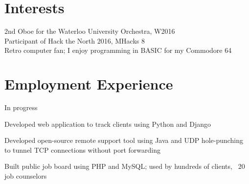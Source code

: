 \documentclass[]{deedy-resume-openfont}
\begin{document}
\begin{minipage}[t]{0.31\textwidth}
\section{Interests}
\textbullet{} 2nd Oboe for the Waterloo University Orchestra, W2016\\
\textbullet{} Participant of Hack the North 2016, MHacks 8\\
\textbullet{} Retro computer fan; I enjoy programming in BASIC for my Commodore 64\\

%
%

\end{minipage} 
\hfill
\begin{minipage}[t]{0.67\textwidth} 


\section{Employment Experience}
\vspace{\topsep} %
\begin{tightemize}
	\item In progress
\end{tightemize}
\sectionsep

\begin{tightemize}
\item Developed web application to track clients using Python and Django
\end{tightemize}
\sectionsep

\begin{tightemize}
\item Developed open-source remote support tool using Java and UDP hole-punching to tunnel TCP connections without port forwarding
\item Built public job board using PHP and MySQL; used by hundreds of clients, ~20 job counselors
\end{tightemize}
\sectionsep


\end{minipage}
\end{document}
